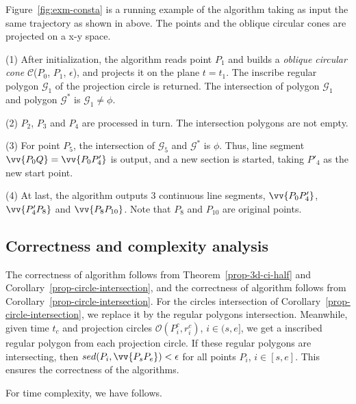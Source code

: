 \begin{example}
\label{exm-alg-conesta}
Figure~\ref{fig:exm-consta} is a running example of the \cista algorithm taking as input the same trajectory as shown in above.
The points and the oblique circular cones are projected on a x-y space.

\ni (1) After initialization, the \cista algorithm reads point $P_1$ and builds a \emph{oblique circular cone} $\mathcal{C}$($P_0$, $P_{1}$, $\epsilon$), and projects it on the plane $t=t_1$. The inscribe regular polygon $\mathcal{G}_1$ of the projection circle is returned. The intersection of polygon $\mathcal{G}_1$ and polygon $\mathcal{G}^*$ is $\mathcal{G}_1 \ne \phi$.

\ni (2) $P_2$, $P_3$ and $P_4$ are processed in turn. The intersection polygons are not empty.

\ni (3) For point $P_5$, the intersection of $\mathcal{G}_5$ and $\mathcal{G}^*$ is $\phi$. Thus, line segment $\vv{P_0Q} =\vv{P_0P'_4}$ is output, and a new section is started, taking $P'_4$ as the new start point.

\ni (4) At last, the algorithm outputs 3 continuous line segments, \ie $\vv{P_0P'_4}$, $\vv{P'_4P_8}$ and $\vv{P_8P_{10}}$. Note that $P_8$ and $P_{10}$ are original points.
\end{example}






\subsection{Correctness and complexity analysis}

The correctness of algorithm \cist follows from Theorem~\ref{prop-3d-ci-half} and Corollary~\ref{prop-circle-intersection}, and the correctness of algorithm \cista follows from Corollary~\ref{prop-circle-intersection}. For the circles intersection of Corollary~\ref{prop-circle-intersection}, we replace it by the regular polygons intersection.
Meanwhile, given time $t_c$ and projection circles $\mathcal{O}(P^c_i, r^c_i)$, $i \in (s, e]$, we get a inscribed regular polygon from each projection circle.
If these regular polygons are intersecting, then $sed(P_i, \vv{P_sP_e})<\epsilon$ for all points $P_i$, $i \in [s,e]$.
This ensures the correctness of the algorithms.


For time complexity, we have follows.





